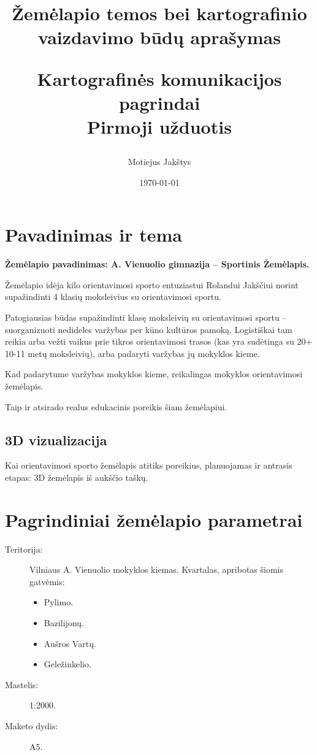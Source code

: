 \documentclass{article}
\title{
    Žemėlapio temos bei kartografinio vaizdavimo būdų aprašymas \\ \vspace{4mm}

    \large Kartografinės komunikacijos pagrindai\\
    Pirmoji užduotis
}
\author{Motiejus Jakštys}
\date{\today}
\begin{document}
\maketitle

\newpage

\section{Pavadinimas ir tema}
\label{sec:tema}

\textbf{Žemėlapio pavadinimas: A. Vienuolio gimnazija -- Sportinis Žemėlapis.}

Žemėlapio idėja kilo orientavimosi sporto entuziastui Rolandui Jakščiui
norint supažindinti 4 klasių moksleivius su orientavimosi sportu.

Patogiausias būdas supažindinti klasę moksleivių su orientavimosi sportu --
suorganizuoti nedideles varžybas per kūno kultūros pamoką. Logistiškai tam
reikia arba vežti vaikus prie tikros orientavimosi trasos (kas yra sudėtinga su
20+ 10-11 metų moksleivių), arba padaryti varžybas jų mokyklos kieme.

Kad padarytume varžybas mokyklos kieme, reikalingas mokyklos orientavimosi
žemėlapis.

Taip ir atsirado realus edukacinis poreikis šiam žemėlapiui.

\subsection{3D vizualizacija}

Kai orientavimosi sporto žemėlapis atitiks poreikius, planuojamas ir antrasis
etapas: 3D žemėlapis iš aukščio taškų.

\section{Pagrindiniai žemėlapio parametrai}

\begin{description}
    \item[Teritorija:] Vilniaus A. Vienuolio mokyklos kiemas. Kvartalas,
        apribotas šiomis gatvėmis:
        \begin{itemize}
            \item Pylimo.
            \item Bazilijonų.
            \item Aušros Vartų.
            \item Geležinkelio.
        \end{itemize}
    \item[Mastelis:] 1:2000.
    \item[Maketo dydis:] A5.
\end{description}
\end{document}
